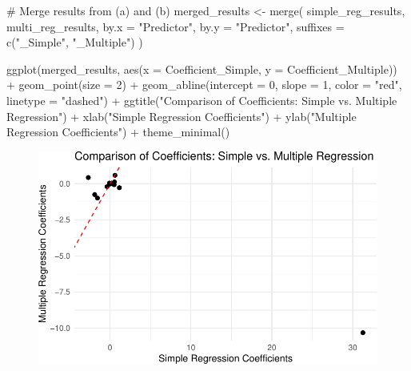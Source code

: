 \documentclass[
]{article}
\newenvironment{Shaded}{\begin{snugshade}}{\end{snugshade}}
\newcommand{\AttributeTok}[1]{\textcolor[rgb]{0.40,0.45,0.13}{#1}}
\newcommand{\CommentTok}[1]{\textcolor[rgb]{0.37,0.37,0.37}{#1}}
\newcommand{\DecValTok}[1]{\textcolor[rgb]{0.68,0.00,0.00}{#1}}
\newcommand{\FunctionTok}[1]{\textcolor[rgb]{0.28,0.35,0.67}{#1}}
\newcommand{\NormalTok}[1]{\textcolor[rgb]{0.00,0.23,0.31}{#1}}
\newcommand{\OtherTok}[1]{\textcolor[rgb]{0.00,0.23,0.31}{#1}}
\newcommand{\SpecialCharTok}[1]{\textcolor[rgb]{0.37,0.37,0.37}{#1}}
\newcommand{\StringTok}[1]{\textcolor[rgb]{0.13,0.47,0.30}{#1}}
\begin{document}
\begin{Shaded}
\begin{Highlighting}[]
\CommentTok{\# Merge results from (a) and (b)}
\NormalTok{merged\_results }\OtherTok{\textless{}{-}} \FunctionTok{merge}\NormalTok{(}
\NormalTok{  simple\_reg\_results,}
\NormalTok{  multi\_reg\_results,}
  \AttributeTok{by.x =} \StringTok{"Predictor"}\NormalTok{,}
  \AttributeTok{by.y =} \StringTok{"Predictor"}\NormalTok{,}
  \AttributeTok{suffixes =} \FunctionTok{c}\NormalTok{(}\StringTok{"\_Simple"}\NormalTok{, }\StringTok{"\_Multiple"}\NormalTok{)}
\NormalTok{)}

\FunctionTok{ggplot}\NormalTok{(merged\_results, }\FunctionTok{aes}\NormalTok{(}\AttributeTok{x =}\NormalTok{ Coefficient\_Simple, }\AttributeTok{y =}\NormalTok{ Coefficient\_Multiple)) }\SpecialCharTok{+}
  \FunctionTok{geom\_point}\NormalTok{(}\AttributeTok{size =} \DecValTok{2}\NormalTok{) }\SpecialCharTok{+}
  \FunctionTok{geom\_abline}\NormalTok{(}\AttributeTok{intercept =} \DecValTok{0}\NormalTok{, }\AttributeTok{slope =} \DecValTok{1}\NormalTok{, }\AttributeTok{color =} \StringTok{"red"}\NormalTok{, }\AttributeTok{linetype =} \StringTok{"dashed"}\NormalTok{) }\SpecialCharTok{+}
  \FunctionTok{ggtitle}\NormalTok{(}\StringTok{"Comparison of Coefficients: Simple vs. Multiple Regression"}\NormalTok{) }\SpecialCharTok{+}
  \FunctionTok{xlab}\NormalTok{(}\StringTok{"Simple Regression Coefficients"}\NormalTok{) }\SpecialCharTok{+}
  \FunctionTok{ylab}\NormalTok{(}\StringTok{"Multiple Regression Coefficients"}\NormalTok{) }\SpecialCharTok{+}
  \FunctionTok{theme\_minimal}\NormalTok{()}
\end{Highlighting}
\end{Shaded}

\begin{figure}[H]

{\centering \includegraphics{hw1_files/figure-pdf/unnamed-chunk-18-1.pdf}

}

\end{figure}
\end{document}
